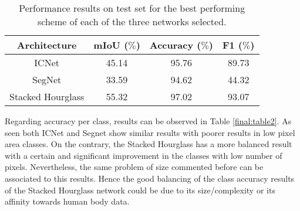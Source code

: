\begin{table}[h!]
  \begin{center}
    
    \begin{tabular}{|c|c|c|c|} %
      \textbf{Architecture} & \textbf{mIoU ($\%$)} & \textbf{Accuracy ($\%$)} & \textbf{F1 ($\%$)} \\
      \hline
      ICNet & 45.14 & 95.76 & 89.73\\
      \hline
      SegNet & 33.59 & 94.62  & 44.32 \\  
      \hline
      Stacked Hourglass & 55.32 & 97.02 & 93.07\\
    \end{tabular}
    \caption{Performance results on test set for the best performing scheme of each of the three networks selected.}
    \label{final:table1}
  \end{center}
\end{table}

Regarding accuracy per class, results can be observed in Table \ref{final:table2}. As seen both ICNet and Segnet show similar results with poorer results in low pixel area classes. On the contrary, the Stacked Hourglass has a more balanced result with a certain and significant improvement in the classes with low number of pixels. Nevertheless, the same problem of size commented before can be associated to this results. Hence the good balancing of the class accuracy results of the Stacked Hourglass network could be due to its size/complexity or its affinity towards human body data.\\


\begin{table}[h!]
  \begin{center}
    \caption{Performance results on test dataset regarding accuracy per class for the best performing schemes of each of the three structures}
    \label{final:table2}
  \end{center}
\end{table}


